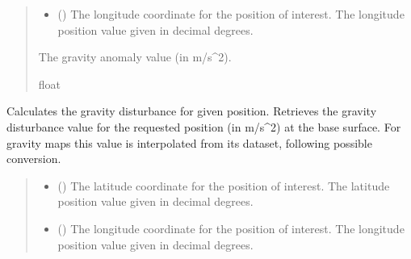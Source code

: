 \documentclass[letterpaper,10pt,english]{sphinxmanual}
\begin{document}
\begin{fulllineitems}
\begin{fulllineitems}
\begin{quote}
\begin{description}
\begin{itemize}
\item {} 
\sphinxAtStartPar
{} () \textendash{} The longitude coordinate for the position of interest.
The longitude position value given in decimal degrees.

\end{itemize}

\sphinxAtStartPar
The gravity anomaly value (in m/s\textasciicircum{}2).

\sphinxAtStartPar
float

\end{description}\end{quote}

\end{fulllineitems}


\begin{fulllineitems}
\label{\detokenize{modules/gravity/map:qnav.gravity.map.GravityMap.get_disturbance}}
\pysigstartsignatures
{}
\pysigstopsignatures
\sphinxAtStartPar
Calculates the gravity disturbance for given position.
Retrieves the gravity disturbance value for the requested position
(in m/s\textasciicircum{}2) at the base surface. For gravity maps this value is
interpolated from its dataset, following possible conversion.
\begin{quote}\begin{description}
\begin{itemize}
\item {} 
\sphinxAtStartPar
{} () \textendash{} The latitude coordinate for the position of interest.
The latitude position value given in decimal degrees.

\item {} 
\sphinxAtStartPar
{} () \textendash{} The longitude coordinate for the position of interest.
The longitude position value given in decimal degrees.


\end{itemize}
\end{description}
\end{quote}
\end{fulllineitems}
\end{fulllineitems}
\end{document}
